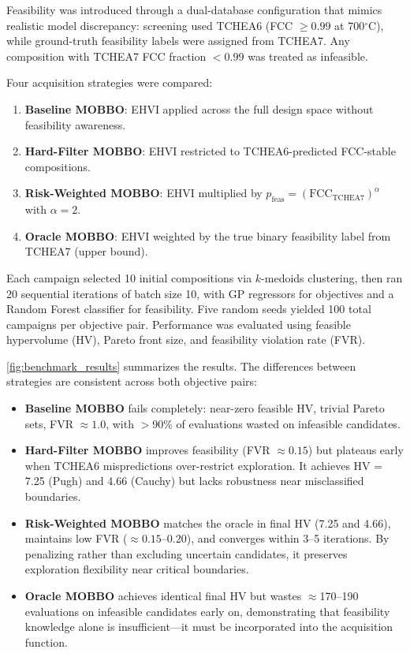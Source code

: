 Feasibility was introduced through a dual-database configuration that mimics realistic model discrepancy: screening used TCHEA6 (FCC $\geq 0.99$ at 700$^\circ$C), while ground-truth feasibility labels were assigned from TCHEA7. Any composition with TCHEA7 FCC fraction $<0.99$ was treated as infeasible.

Four acquisition strategies were compared:

\begin{enumerate}
    \item \textbf{Baseline MOBBO}: EHVI applied across the full design space without feasibility awareness.
    \item \textbf{Hard-Filter MOBBO}: EHVI restricted to TCHEA6-predicted FCC-stable compositions.
    \item \textbf{Risk-Weighted MOBBO}: EHVI multiplied by $p_{\text{feas}} = (\text{FCC}_{\text{TCHEA7}})^{\alpha}$ with $\alpha = 2$.
    \item \textbf{Oracle MOBBO}: EHVI weighted by the true binary feasibility label from TCHEA7 (upper bound).
\end{enumerate}

Each campaign selected 10 initial compositions via $k$-medoids clustering, then ran 20 sequential iterations of batch size 10, with GP regressors for objectives and a Random Forest classifier for feasibility. Five random seeds yielded 100 total campaigns per objective pair. Performance was evaluated using feasible hypervolume (HV), Pareto front size, and feasibility violation rate (FVR).

\autoref{fig:benchmark_results} summarizes the results. The differences between strategies are consistent across both objective pairs:



\begin{itemize}

\item \textbf{Baseline MOBBO} fails completely: near-zero feasible HV, trivial Pareto sets, FVR $\approx 1.0$, with $>$90\% of evaluations wasted on infeasible candidates.

\item \textbf{Hard-Filter MOBBO} improves feasibility (FVR $\approx 0.15$) but plateaus early when TCHEA6 mispredictions over-restrict exploration. It achieves HV = 7.25 (Pugh) and 4.66 (Cauchy) but lacks robustness near misclassified boundaries.

\item \textbf{Risk-Weighted MOBBO} matches the oracle in final HV (7.25 and 4.66), maintains low FVR ($\approx 0.15$--0.20), and converges within 3--5 iterations. By penalizing rather than excluding uncertain candidates, it preserves exploration flexibility near critical boundaries.

\item \textbf{Oracle MOBBO} achieves identical final HV but wastes $\approx$170--190 evaluations on infeasible candidates early on, demonstrating that feasibility knowledge alone is insufficient---it must be incorporated into the acquisition function.

\end{itemize}

